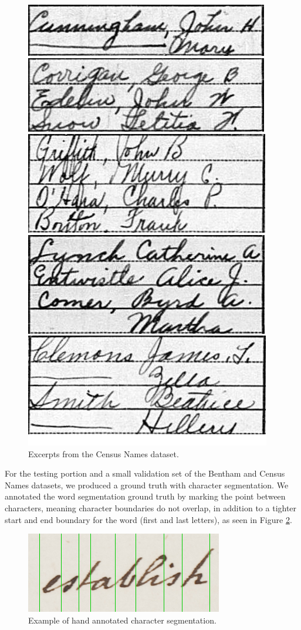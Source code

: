 \documentclass[ms,electronic,twosidetoc,letterpaper,chaptercenter,parttop,lol,lof,lot]{byumsphd}
\begin{document}
\begin{figure}
    \centering
    \includegraphics[width=.75\textwidth]{names_examples}
    \caption{Excerpts from the Census Names dataset.}
    \label{fig:NamesExamples}
\end{figure}

For the testing portion and a small validation set of the Bentham and Census Names datasets, we produced a ground truth with character segmentation. We annotated the word segmentation ground truth by marking the point between characters, meaning character boundaries do not overlap, in addition to a tighter start and end boundary for the word (first and last letters), as seen in Figure \ref{fig:charseg}.

\begin{figure}
    \centering
    \includegraphics[width=.5\textwidth]{charseg}
    \caption{Example of hand annotated character segmentation.}
    \label{fig:charseg}
\end{figure}
\end{document}
